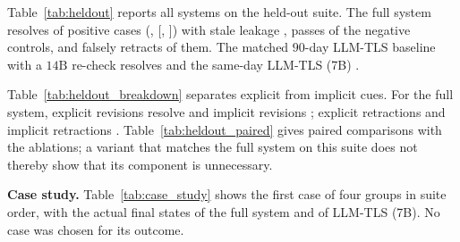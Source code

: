 \documentclass[journal]{IEEEtran}
\begin{document}
Table~\ref{tab:heldout} reports all systems on the held-out suite. The full system resolves \HeldFullK{} of \HeldPos{} positive cases (\HeldFullRRA{}, [\HeldFullLo{}, \HeldFullHi{}]) with stale leakage \HeldFullSFLR{}, passes \HeldFullNegPass{} of the negative controls, and falsely retracts \HeldFullFalseRetr{} of them. The matched $90$-day LLM-TLS baseline with a $14\text{B}$ re-check resolves \HeldBaseNinetyRRA{} and the same-day LLM-TLS (7B) \HeldBaseSevenRRA{}.

\begin{table}[t]
\centering
\caption{Held-out suite by case group (resolved / total).}
\label{tab:heldout_breakdown}
\renewcommand{\arraystretch}{1.1}
\resizebox{\columnwidth}{!}{}
\end{table}

\begin{table}[t]
\centering
\caption{Paired differences in pass rate (variant minus full) over all \HeldN{} cases. McNemar $p$ is exact and two-sided; Holm adjusts across variants.}
\label{tab:heldout_paired}
\renewcommand{\arraystretch}{1.1}
\resizebox{\columnwidth}{!}{}
\end{table}

Table~\ref{tab:heldout_breakdown} separates explicit from implicit cues. For the full system, explicit revisions resolve \HeldFullRevExp{} and implicit revisions \HeldFullRevImp{}; explicit retractions \HeldFullRetExp{} and implicit retractions \HeldFullRetImp{}. Table~\ref{tab:heldout_paired} gives paired comparisons with the ablations; a variant that matches the full system on this suite does not thereby show that its component is unnecessary.


\textbf{Case study.} Table~\ref{tab:case_study} shows the first case of four groups in suite order, with the actual final states of the full system and of LLM-TLS (7B). No case was chosen for its outcome.

\begin{table}[t]
\centering
\caption{Held-out case study: first case of each group in suite order; $\checkmark$/$\times$ marks the automatic resolution test.}
\label{tab:case_study}
\renewcommand{\arraystretch}{1.15}
\footnotesize

\end{table}
\end{document}
